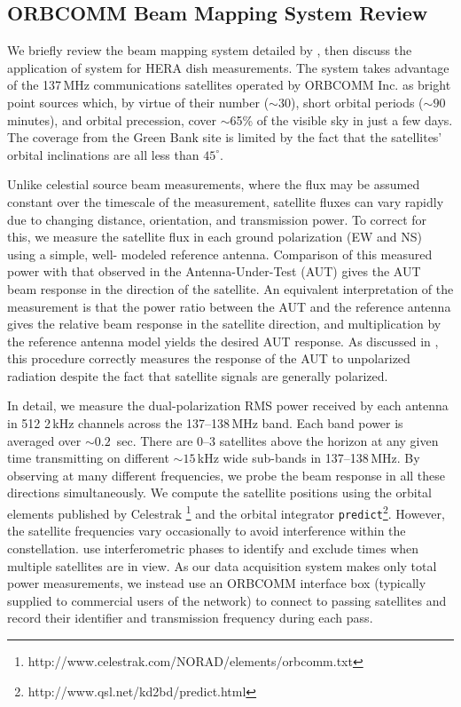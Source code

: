 \documentclass{emulateapj}
\begin{document}
\subsection{ORBCOMM Beam Mapping System Review}
\label{sec:orbcommreview}

We briefly review the beam mapping system detailed by \citet{neben15}, then discuss the 
application of system for HERA dish measurements. The system 
takes advantage of the 137\,MHz communications satellites operated by ORBCOMM Inc. 
as bright point sources which, by virtue of their number ($\sim30$), short orbital periods 
($\sim90$ minutes), and orbital precession, cover $\sim$65\% of the visible sky in just a few 
days. The coverage from the Green Bank site is limited by the fact that the satellites' orbital inclinations are all less 
than $45^\circ$. 

Unlike celestial source beam measurements, where the flux may be 
assumed constant over the timescale of the measurement, satellite fluxes can vary rapidly 
due to changing distance, orientation, and transmission power. To correct for this, we 
measure the satellite flux in each ground polarization (EW and NS) using a simple, well-
modeled reference antenna. Comparison of this measured power with that observed in the 
Antenna-Under-Test (AUT) gives the AUT beam response in the direction of the satellite. 
An equivalent interpretation of the measurement is that the power ratio between the AUT and the reference 
antenna gives the relative beam response in the satellite direction, and multiplication by 
the reference antenna model yields the desired AUT response. As discussed in 
\citet{neben15}, this procedure correctly measures the response of the AUT to unpolarized radiation
 despite the fact that satellite signals are generally polarized.

In detail, we measure the dual-polarization RMS power received by each antenna in 512 2\,kHz 
channels across the 137--138\,MHz band. Each band power is averaged over $\sim0.2$
\,sec. There are 0--3 satellites above the horizon at any given time transmitting on different 
$\sim15$\,kHz wide sub-bands in 137--138\,MHz. By observing at many different 
frequencies, we probe the beam response in all these directions simultaneously. We 
compute the satellite positions using the orbital elements published by Celestrak
\footnote{http://www.celestrak.com/NORAD/elements/orbcomm.txt} and the orbital 
integrator \texttt{predict}\footnote{http://www.qsl.net/kd2bd/predict.html}. However, the 
satellite frequencies vary occasionally to avoid interference within the constellation. 
\citet{zheng14} use interferometric phases to identify and exclude times when multiple 
satellites are in view. As our data acquisition system makes only total power 
measurements, we instead use an ORBCOMM interface box (typically supplied to 
commercial users of the network) to connect to passing satellites and record their identifier 
and transmission frequency during each pass.
\end{document}
